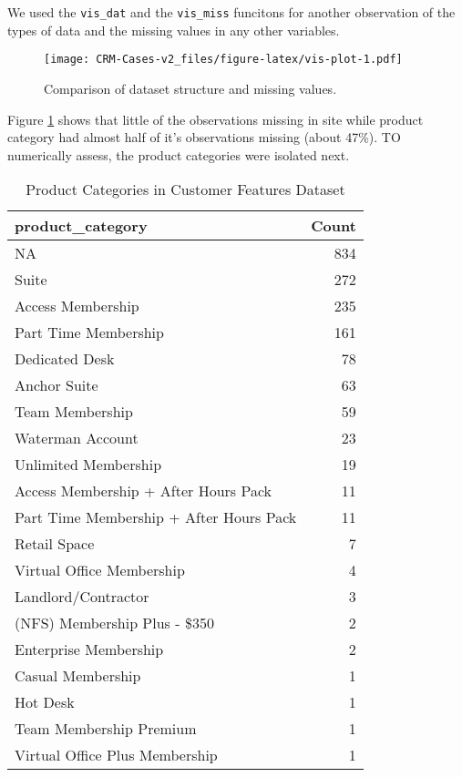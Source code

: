\documentclass[
]{article}
\begin{document}
We used the \texttt{vis\_dat} and the \texttt{vis\_miss} funcitons for another observation of the types of data and the missing values in any other variables.

\begin{figure}
\centering
\texttt{[image: CRM-Cases-v2\_files/figure-latex/vis-plot-1.pdf]}
\caption{\label{fig:vis-plot}Comparison of dataset structure and missing values.}
\end{figure}

Figure \ref{fig:vis-plot} shows that little of the observations missing in site while product category had almost half of it's observations missing (about 47\%). TO numerically assess, the product categories were isolated next.

\begin{table}

\caption{\label{tab:product-table}Product Categories in Customer Features Dataset}
\centering
\begin{tabular}[t]{l|r}
\hline
product\_category & Count\\
\hline
NA & 834\\
\hline
Suite & 272\\
\hline
Access Membership & 235\\
\hline
Part Time Membership & 161\\
\hline
Dedicated Desk & 78\\
\hline
Anchor Suite & 63\\
\hline
Team Membership & 59\\
\hline
Waterman Account & 23\\
\hline
Unlimited Membership & 19\\
\hline
Access Membership + After Hours Pack & 11\\
\hline
Part Time Membership + After Hours Pack & 11\\
\hline
Retail Space & 7\\
\hline
Virtual Office Membership & 4\\
\hline
Landlord/Contractor & 3\\
\hline
(NFS) Membership Plus - \$350 & 2\\
\hline
Enterprise Membership & 2\\
\hline
Casual Membership & 1\\
\hline
Hot Desk & 1\\
\hline
Team Membership Premium & 1\\
\hline
Virtual Office Plus Membership & 1\\
\hline
\end{tabular}
\end{table}
\end{document}
